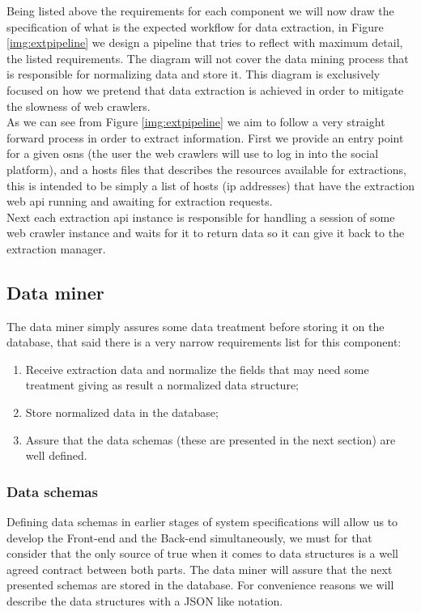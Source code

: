 Being listed above the requirements for each component we will now draw the specification of what is the expected workflow for data extraction, in Figure \ref{img:extpipeline} we design a pipeline that tries to reflect with maximum detail, the listed requirements. The diagram will not cover the data mining process that is responsible for normalizing data and store it. This diagram is exclusively focused on how we pretend that data extraction is achieved in order to mitigate the slowness of web crawlers.\\
\indent As we can see from Figure \ref{img:extpipeline} we aim to follow a very straight forward process in order to extract information. First we provide an entry point for a given \glspl{osn} (the user the web crawlers will use to log in into the social platform), and a hosts files that describes the resources available for extractions, this is intended to be simply a list of hosts (ip addresses) that have the extraction web \gls{api} running and awaiting for extraction requests.\\
\indent Next each extraction \gls{api} instance is responsible for handling a session of some web crawler instance and waits for it to return data so it can give it back to the extraction manager.

\clearpage

\subsection{Data miner}

The data miner simply assures some data treatment before storing it on the database, that said there is a very narrow requirements list for this component:

\begin{enumerate}
\item Receive extraction data and normalize the fields that may need some treatment giving as result a normalized data structure;
\item Store normalized data in the database;
\item Assure that the data schemas (these are presented in the next section) are well defined.
\end{enumerate}

\subsubsection{Data schemas}

Defining data schemas in earlier stages of system specifications will allow us to develop the Front-end and the Back-end simultaneously, we must for that consider that the only source of true when it comes to data structures is a well agreed contract between both parts. The data miner will assure that the next presented schemas are stored in the database. For convenience reasons we will describe the data structures with a JSON like notation.

